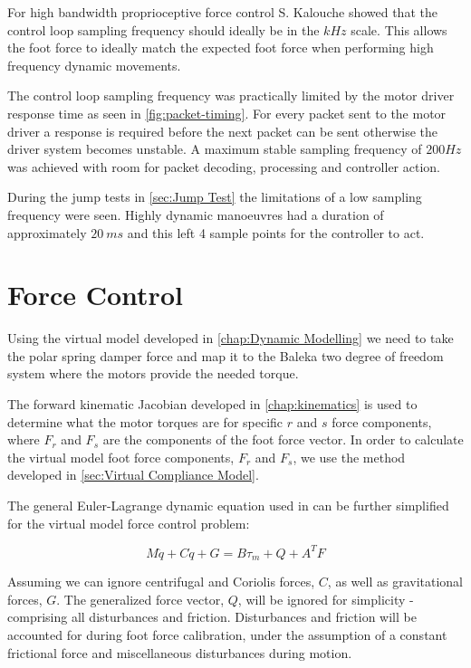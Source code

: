 For high bandwidth proprioceptive force control S. Kalouche showed that the control loop sampling frequency should ideally be in the $kHz$ scale.\cite{Kalouche2016} This allows the foot force to ideally match the expected foot force when performing high frequency dynamic movements. 

The control loop sampling frequency was practically limited by the motor driver response time as seen in \cref{fig:packet-timing}. For every packet sent to the motor driver a response is required before the next packet can be sent otherwise the driver system becomes unstable. A maximum stable sampling frequency of $200 Hz$ was achieved with room for packet decoding, processing and controller action.

During the jump tests in \cref{sec:Jump Test} the limitations of a low sampling frequency were seen. Highly dynamic manoeuvres had a duration of approximately $20\ ms$ and this left 4 sample points for the controller to act.

\section{Force Control}
\label{sec:Force Control}

Using the virtual model developed in \cref{chap:Dynamic Modelling} we need to take the polar spring damper force and map it to the Baleka two degree of freedom system where the motors provide the needed torque.

The forward kinematic Jacobian developed in \cref{chap:kinematics} is used to determine what the motor torques are for specific $r$ and $s$ force components, where $F_r$ and $F_s$ are the components of the foot force vector. In order to calculate the virtual model foot force components, $F_r$ and $F_s$, we use the method developed in \cref{sec:Virtual Compliance Model}.

The general Euler-Lagrange dynamic equation used in \cite{Patel2015} can be further simplified for the virtual model force control problem:

\begin{equation} \label{eq:dynamic-eq}
M\ddot{q} + C\dot{q} + G = B \tau_m + Q + A^T F
\end{equation}

Assuming we can ignore centrifugal and Coriolis forces, $C$, as well as gravitational forces, $G$. The generalized force vector, $Q$, will be ignored for simplicity - comprising all disturbances and friction. Disturbances and friction will be accounted for during foot force calibration, under the assumption of a constant frictional force and miscellaneous disturbances during motion. 

